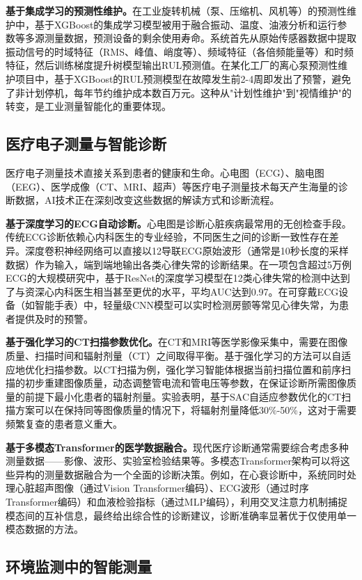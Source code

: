 \documentclass[12pt,a4paper]{article}
\numberwithin{figure}{section}
\numberwithin{table}{section}
\numberwithin{equation}{section}
\begin{document}
\textbf{基于集成学习的预测性维护。}在工业旋转机械（泵、压缩机、风机等）的预测性维护中，基于XGBoost的集成学习模型被用于融合振动、温度、油液分析和运行参数等多源测量数据，预测设备的剩余使用寿命。系统首先从原始传感器数据中提取振动信号的时域特征（RMS、峰值、峭度等）、频域特征（各倍频能量等）和时频特征，然后训练梯度提升树模型输出RUL预测值。在某化工厂的离心泵预测性维护项目中，基于XGBoost的RUL预测模型在故障发生前2-4周即发出了预警，避免了非计划停机，每年节约维护成本数百万元。这种从"计划性维护"到"视情维护"的转变，是工业测量智能化的重要体现。

\subsection{医疗电子测量与智能诊断}

医疗电子测量技术直接关系到患者的健康和生命。心电图（ECG）、脑电图（EEG）、医学成像（CT、MRI、超声）等医疗电子测量技术每天产生海量的诊断数据，AI技术正在深刻改变这些数据的解读方式和诊断流程。

\textbf{基于深度学习的ECG自动诊断。}心电图是诊断心脏疾病最常用的无创检查手段。传统ECG诊断依赖心内科医生的专业经验，不同医生之间的诊断一致性存在差异。深度卷积神经网络可以直接以12导联ECG原始波形（通常是10秒长度的采样数据）作为输入，端到端地输出各类心律失常的诊断结果。在一项包含超过5万例ECG的大规模研究中，基于ResNet的深度学习模型在12类心律失常的检测中达到了与资深心内科医生相当甚至更优的水平，平均AUC达到0.97。在可穿戴ECG设备（如智能手表）中，轻量级CNN模型可以实时检测房颤等常见心律失常，为患者提供及时的预警。

\textbf{基于强化学习的CT扫描参数优化。}在CT和MRI等医学影像采集中，需要在图像质量、扫描时间和辐射剂量（CT）之间取得平衡。基于强化学习的方法可以自适应地优化扫描参数。以CT扫描为例，强化学习智能体根据当前扫描位置和前序扫描的初步重建图像质量，动态调整管电流和管电压等参数，在保证诊断所需图像质量的前提下最小化患者的辐射剂量。实验表明，基于SAC自适应参数优化的CT扫描方案可以在保持同等图像质量的情况下，将辐射剂量降低30\%-50\%，这对于需要频繁复查的患者意义重大。

\textbf{基于多模态Transformer的医学数据融合。}现代医疗诊断通常需要综合考虑多种测量数据——影像、波形、实验室检验结果等。多模态Transformer架构可以将这些异构的测量数据融合为一个全面的诊断决策。例如，在心衰诊断中，系统同时处理心脏超声图像（通过Vision Transformer编码）、ECG波形（通过时序Transformer编码）和血液检验指标（通过MLP编码），利用交叉注意力机制捕捉模态间的互补信息，最终给出综合性的诊断建议，诊断准确率显著优于仅使用单一模态数据的方法。

\subsection{环境监测中的智能测量}
\end{document}
